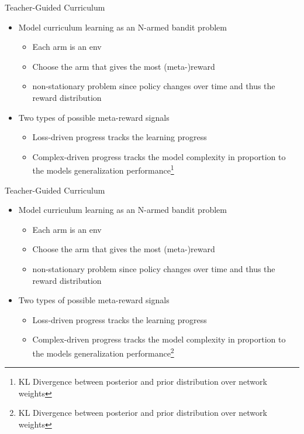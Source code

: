 \begin{frame}[c]{Teacher-Guided Curriculum }
	
	\begin{itemize}
		\item Model curriculum learning as an N-armed bandit problem
		\begin{itemize}
			\item Each arm is an env 
			\item Choose the arm that gives the most (meta-)reward
			\item non-stationary problem since policy changes over time and thus the reward distribution
		\end{itemize}
		\smallskip
		\item Two types of possible meta-reward signals
		\begin{itemize}
			\item Loss-driven progress tracks the learning progress
			\item Complex-driven progress tracks the model complexity in proportion to the models generalization performance\footnote{KL Divergence between posterior and prior distribution over network weights}
		\end{itemize}
	\end{itemize}
	
\end{frame}
\begin{frame}[c]{Teacher-Guided Curriculum }
	
	\begin{itemize}
		\item Model curriculum learning as an N-armed bandit problem
		\begin{itemize}
			\item Each arm is an env 
			\item Choose the arm that gives the most (meta-)reward
			\item non-stationary problem since policy changes over time and thus the reward distribution
		\end{itemize}
		\smallskip
		\pause
		\item Two types of possible meta-reward signals
		\begin{itemize}
			\item Loss-driven progress tracks the learning progress
			\item Complex-driven progress tracks the model complexity in proportion to the models generalization performance\footnote{KL Divergence between posterior and prior distribution over network weights}
		\end{itemize}
	\end{itemize}
	
\end{frame}
